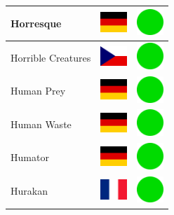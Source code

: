 \documentclass[12pt, a4paper, twoside]{report}
\begin{document}
\begin{center}
\begin{longtable}{|p{5cm}|p{2cm}|p{2cm}|}
 Horresque                                                  & \includegraphics[width=1cm]{4x3/de} &   \includegraphics[width=1cm]{likes/y} \\ \hline
 Horrible Creatures                                         & \includegraphics[width=1cm]{4x3/cz} &   \includegraphics[width=1cm]{likes/y} \\ \hline
 Human Prey                                                 & \includegraphics[width=1cm]{4x3/de} &   \includegraphics[width=1cm]{likes/y} \\ \hline
 Human Waste                                                & \includegraphics[width=1cm]{4x3/de} &   \includegraphics[width=1cm]{likes/y} \\ \hline
 Humator                                                    & \includegraphics[width=1cm]{4x3/de} &   \includegraphics[width=1cm]{likes/y} \\ \hline
 Hurakan                                                    & \includegraphics[width=1cm]{4x3/fr} &   \includegraphics[width=1cm]{likes/y} \\ \hline

\end{longtable}
\end{center}
\end{document}
